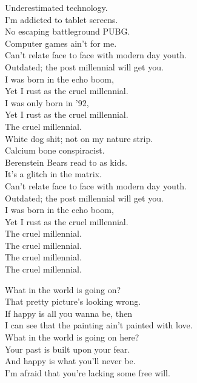 
Underestimated technology. \\
I'm addicted to tablet screens. \\
No escaping battleground PUBG. \\
Computer games ain't for me. \\
Can't relate face to face with modern day youth. \\
Outdated; the post millennial will get you. \\
I was born in the echo boom, \\
Yet I rust as the cruel millennial. \\
I was only born in '92, \\
Yet I rust as the cruel millennial. \\

The cruel millennial. \\

White dog shit; not on my nature strip. \\
Calcium bone conspiracist. \\
Berenstein Bears read to as kids. \\
It's a glitch in the matrix. \\
Can't relate face to face with modern day youth. \\
Outdated; the post millennial will get you. \\
I was born in the echo boom, \\
Yet I rust as the cruel millennial. \\

The cruel millennial. \\
The cruel millennial. \\
The cruel millennial. \\
The cruel millennial. \\




What in the world is going on? \\
That pretty picture's looking wrong. \\
If happy is all you wanna be, then \\
I can see that the painting ain't painted with love. \\
What in the world is going on here? \\
Your past is built upon your fear. \\
And happy is what you'll never be. \\
I'm afraid that you're lacking some free will. \\


